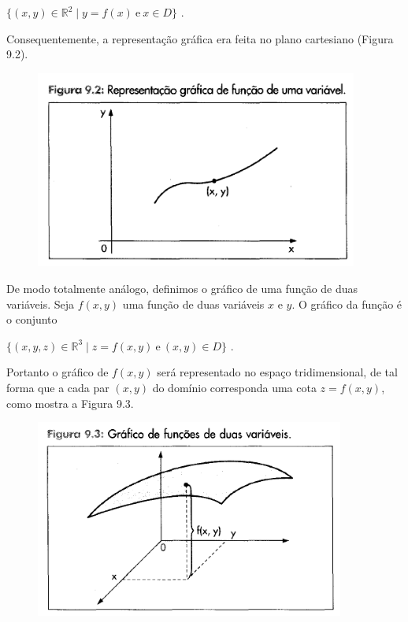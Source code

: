 		\bigskip

		{\LARGE $\{(x, y) \in \mathbb{R}^{2} \mid y = f(x) \ \text{e} \ x \in D\}$} .

		\bigskip

		Consequentemente, a representação gráfica era feita no plano cartesiano (Figura 9.2).

		\begin{figure}[H]
			\includegraphics[height=6.5cm]{images/morettin_figura-9-2}
		\end{figure}

		De modo totalmente análogo, definimos o gráfico de uma função de duas variáveis. Seja $f(x, y)$ uma função de duas variáveis $x$ e $y$. O gráfico da função é o conjunto

		\bigskip

		{\LARGE $\{(x, y, z) \in \mathbb{R}^{3} \mid z = f(x, y) \ \text{e} \ (x, y) \in D\}$} .

		\bigskip

		Portanto o gráfico de $f(x, y)$ será representado no espaço tridimensional, de tal forma que a cada par $(x, y)$ do domínio corresponda uma cota $z = f(x, y)$, como mostra a Figura 9.3.

		\begin{figure}[H]
			\includegraphics[height=6.5cm]{images/morettin_figura-9-3}
		\end{figure}
		
